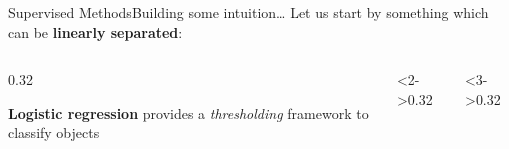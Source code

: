 \begin{frame}{Supervised Methods}{Building some intuition\dots}
    Let us start by something which can be \textbf{linearly separated}:
    \vfill
    \begin{columns}[T]
        \begin{column}{0.32\textwidth}
            \begin{center}
                

                \textbf{Logistic regression} provides a \emph{thresholding} framework to classify objects
            \end{center}
        \end{column}
        \hfil
        \begin{column}<2->{0.32\textwidth}
            \begin{center}
                

            \end{center}
        \end{column}
        \hfil
        \begin{column}<3->{0.32\textwidth}
            \begin{center}
                

            \end{center}
        \end{column}
    \end{columns}
\end{frame}

